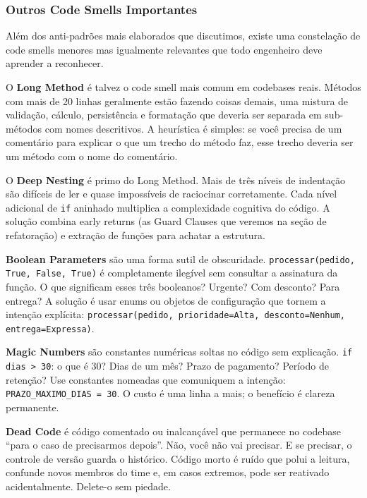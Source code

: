 \subsubsection{Outros Code Smells Importantes}

Além dos anti-padrões mais elaborados que discutimos, existe uma constelação
de code smells menores mas igualmente relevantes que todo engenheiro deve
aprender a reconhecer.

O \textbf{Long Method} é talvez o code smell mais comum em codebases reais.
Métodos com mais de 20 linhas geralmente estão fazendo coisas demais, uma
mistura de validação, cálculo, persistência e formatação que deveria ser
separada em sub-métodos com nomes descritivos. A heurística é simples: se
você precisa de um comentário para explicar o que um trecho do método faz,
esse trecho deveria ser um método com o nome do comentário.

O \textbf{Deep Nesting} é primo do Long Method. Mais de três níveis de
indentação são difíceis de ler e quase impossíveis de raciocinar
corretamente. Cada nível adicional de \texttt{if} aninhado multiplica a
complexidade cognitiva do código. A solução combina early returns (as Guard
Clauses que veremos na seção de refatoração) e extração de funções para
achatar a estrutura.

\textbf{Boolean Parameters} são uma forma sutil de obscuridade.
\texttt{processar(pedido, True, False, True)} é completamente ilegível sem
consultar a assinatura da função. O que significam esses três booleanos?
Urgente? Com desconto? Para entrega? A solução é usar enums ou objetos de
configuração que tornem a intenção explícita:
\texttt{processar(pedido, prioridade=Alta, desconto=Nenhum, entrega=Expressa)}.

\textbf{Magic Numbers} são constantes numéricas soltas no código sem
explicação. \texttt{if dias > 30}: o que é 30? Dias de um mês? Prazo de
pagamento? Período de retenção? Use constantes nomeadas que comuniquem a
intenção: \texttt{PRAZO\_MAXIMO\_DIAS = 30}. O custo é uma linha a mais;
o benefício é clareza permanente.

\textbf{Dead Code} é código comentado ou inalcançável que permanece no
codebase ``para o caso de precisarmos depois''. Não, você não vai precisar.
E se precisar, o controle de versão guarda o histórico. Código morto é ruído
que polui a leitura, confunde novos membros do time e, em casos extremos,
pode ser reativado acidentalmente. Delete-o sem piedade.


